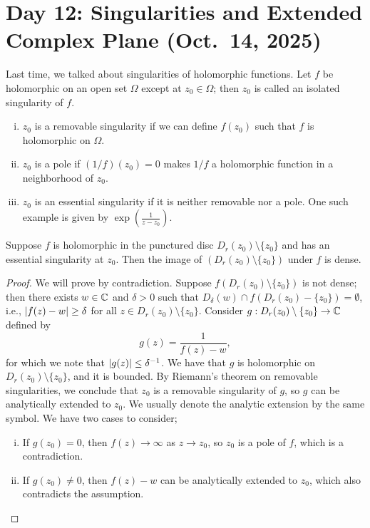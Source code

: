 \section{Day 12: Singularities and Extended Complex Plane (Oct.\ 14, 2025)}
Last time, we talked about singularities of holomorphic functions. Let $f$ be holomorphic on an open set $\Omega$ except at $z_0 \in \Omega$; then $z_0$ is called an isolated singularity of $f$.
\begin{enumerate}[(i)]
    \item $z_0$ is a removable singularity if we can define $f(z_0)$ such that $f$ is holomorphic on $\Omega$.
    \item $z_0$ is a pole if $(1/f)(z_0) = 0$ makes $1/f$ a holomorphic function in a neighborhood of $z_0$.
    \item $z_0$ is an essential singularity if it is neither removable nor a pole. One such example is given by $\exp(\frac{1}{z - z_0})$.
\end{enumerate}
\begin{theorem}
    Suppose $f$ is holomorphic in the punctured disc $D_r(z_0) \setminus \{z_0\}$ and has an essential singularity at $z_0$. Then the image of $(D_r(z_0) \setminus \{z_0\})$ under $f$ is dense.
\end{theorem}
\begin{proof}
    We will prove by contradiction. Suppose $f(D_r(z_0) \setminus \{z_0\})$ is not dense; then there exists $w \in \mathbb C$ and $\delta > 0$ such that $D_\delta(w) \cap f(D_r(z_0) - \{z_0\}) = \emptyset$, i.e., $\left\lvert f(z) - w \right\rvert \geq \delta$ for all $z \in D_r(z_0) \setminus \{z_0\}$. Consider $g : D_r(z_0) \setminus \{z_0\} \to \mathbb C$ defined by
    \[ g(z) = \frac{1}{f(z) - w}, \]
    for which we note that $\left\lvert g(z) \right\rvert \leq \delta^{-1}$. We have that $g$ is holomorphic on $D_r(z_0) \setminus \{z_0\}$, and it is bounded. By Riemann's theorem on removable singularities, we conclude that $z_0$ is a removable singularity of $g$, so $g$ can be analytically extended to $z_0$. We usually denote the analytic extension by the same symbol. We have two cases to consider;
    \begin{enumerate}[(i)]
        \item If $g(z_0) = 0$, then $f(z) \to \infty$ as $z \to z_0$, so $z_0$ is a pole of $f$, which is a contradiction.
        \item If $g(z_0) \neq 0$, then $f(z) - w$ can be analytically extended to $z_0$, which also contradicts the assumption. \qedhere
    \end{enumerate}
\end{proof}
